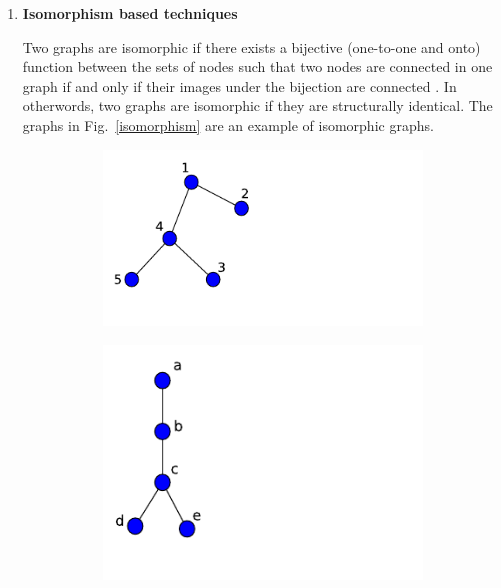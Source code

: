\documentclass[10pt,a4paper]{article}
\begin{document}
     \begin{enumerate}
     	\item \textbf{Isomorphism based techniques}
     	
     	 Two graphs are isomorphic if there exists a bijective (one-to-one and onto) function between the sets of nodes
     	such that two nodes are connected in one graph if and only if their images under the bijection are connected \citep{zager2008graph}. In otherwords, two graphs are isomorphic if they are structurally identical. The graphs in Fig.~\ref{isomorphism} are an example of isomorphic graphs.
     	
     	\begin{figure}[H]
     		\centering
     		\begin{subfigure}[b]{0.35\textwidth}
     			\includegraphics[width=\textwidth]{images/graph-isomorphism1.pdf}
     			\caption{}
     			\label{isomorphic1}
     		\end{subfigure}
     		\begin{subfigure}[b]{0.35\textwidth}
     			\includegraphics[width=\textwidth]{images/graph-isomorphism2.pdf}

\end{subfigure}
\end{figure}
\end{enumerate}
\end{document}
